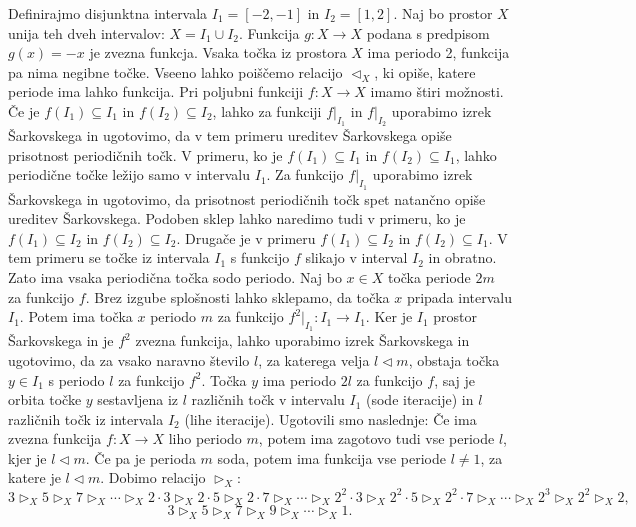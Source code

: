 \documentclass[../TG_magistrsko_delo_sections.tex]{subfiles}
\begin{document}
\begin{primer}
Definirajmo disjunktna intervala $I_1 = [-2, -1]$ in $I_2 = [1, 2]$. Naj bo prostor $X$ unija teh dveh intervalov: $X=I_1 \cup I_2$. Funkcija $g \colon X \to X$ podana s predpisom $g(x) = -x$ je zvezna funkcja. Vsaka točka iz prostora $X$ ima periodo 2, funkcija pa nima negibne točke. Vseeno lahko poiščemo relacijo $\triangleleft_X$, ki opiše, katere periode ima lahko funkcija.  Pri poljubni funkciji $f \colon X \to X$ imamo štiri možnosti. Če je $f(I_1) \subseteq I_1$ in $f(I_2) \subseteq I_2$, lahko za funkciji $f|_{I_1}$ in $f|_{I_2}$ uporabimo izrek Šarkovskega in ugotovimo, da v tem primeru ureditev Šarkovskega opiše prisotnost periodičnih točk. V primeru, ko je $f(I_1) \subseteq I_1$ in $f(I_2) \subseteq I_1$, lahko periodične točke ležijo samo v intervalu $I_1$. Za funkcijo $f|_{I_1}$ uporabimo izrek Šarkovskega in ugotovimo, da prisotnost periodičnih točk spet natančno opiše ureditev Šarkovskega. Podoben sklep lahko naredimo tudi v primeru, ko je $f(I_1) \subseteq I_2$ in $f(I_2) \subseteq I_2$. Drugače je v primeru $f(I_1) \subseteq I_2$ in $f(I_2) \subseteq I_1$. V tem primeru se točke iz intervala $I_1$ s funkcijo $f$ slikajo v interval $I_2$ in obratno. Zato ima vsaka periodična točka sodo periodo. Naj bo $x \in X$ točka periode $2m$ za funkcijo $f$. Brez izgube splošnosti lahko sklepamo, da točka $x$ pripada intervalu $I_1$. Potem ima točka $x$ periodo $m$ za funkcijo $f^2|_{I_1} \colon I_1 \to I_1$. Ker je $I_1$ prostor Šarkovskega in je $f^2$ zvezna funkcija, lahko uporabimo izrek Šarkovskega in ugotovimo, da za vsako naravno število $l$, za katerega velja $l \triangleleft m$, obstaja točka $y \in I_1$ s periodo $l$ za funkcijo $f^2$. Točka $y$ ima periodo $2l$ za funkcijo $f$, saj je orbita točke $y$ sestavljena iz $l$ različnih točk v intervalu $I_1$ (sode iteracije) in $l$ različnih točk iz intervala $I_2$ (lihe iteracije). 
Ugotovili smo naslednje: Če ima zvezna funkcija $f \colon X \to X$ liho periodo $m$, potem ima zagotovo tudi vse periode $l$, kjer je $l \triangleleft m$. Če pa je perioda $m$ soda, potem ima funkcija vse periode $l\neq1$, za katere je $l \triangleleft m$. 
Dobimo relacijo $\triangleright_X$:
$$3 \triangleright_X 5 \triangleright_X 7 \triangleright_X \cdots \triangleright_X 2\cdot 3 \triangleright_X 2\cdot 5 \triangleright_X 2\cdot 7 \triangleright_X \cdots \triangleright_X 2^2\cdot 3 \triangleright_X 2^2\cdot 5 \triangleright_X 2^2\cdot 7 \triangleright_X \cdots \triangleright_X 2^3 \triangleright_X 2^2 \triangleright_X 2,$$
$$3 \triangleright_X 5 \triangleright_X 7 \triangleright_X 9 \triangleright_X  \cdots \triangleright_X 1.$$
\end{primer}
\end{document}
